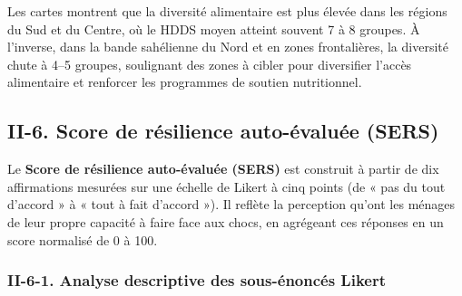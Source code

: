 \documentclass[
]{article}
\begin{document}
Les cartes montrent que la diversité alimentaire est plus élevée dans
les régions du Sud et du Centre, où le HDDS moyen atteint souvent 7 à 8
groupes. À l'inverse, dans la bande sahélienne du Nord et en zones
frontalières, la diversité chute à 4--5 groupes, soulignant des zones à
cibler pour diversifier l'accès alimentaire et renforcer les programmes
de soutien nutritionnel.

\hypertarget{ii-6.-score-de-ruxe9silience-auto-uxe9valuuxe9e-sers}{%
\subsection{II-6. Score de résilience auto-évaluée
(SERS)}\label{ii-6.-score-de-ruxe9silience-auto-uxe9valuuxe9e-sers}}

Le \textbf{Score de résilience auto-évaluée (SERS)} est construit à
partir de dix affirmations mesurées sur une échelle de Likert à cinq
points (de « pas du tout d'accord » à « tout à fait d'accord »). Il
reflète la perception qu'ont les ménages de leur propre capacité à faire
face aux chocs, en agrégeant ces réponses en un score normalisé de 0 à
100.

\hypertarget{ii-6-1.-analyse-descriptive-des-sous-uxe9noncuxe9s-likert}{%
\subsubsection{II-6-1. Analyse descriptive des sous-énoncés
Likert}\label{ii-6-1.-analyse-descriptive-des-sous-uxe9noncuxe9s-likert}}
\end{document}

